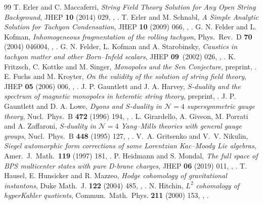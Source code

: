 \begin{thebibliography}{99}
 T. Erler and C. Maccaferri, \emph{String Field Theory Solution for Any Open String Background}, JHEP \textbf{10} (2014) 029, , .
 T. Erler and M. Schnabl, \emph{A Simple Analytic Solution for Tachyon Condensation}, JHEP \textbf{10} (2009) 066, , .
 G. N. Felder and L. Kofman, \emph{Inhomogeneous fragmentation of the rolling tachyon}, Phys.\ Rev.\ D \textbf{70} (2004) 046004, , .
 G. N. Felder, L. Kofman and A. Starobinsky, \emph{Caustics in ta\-chy\-on matter and other Born--In\-feld scalars}, JHEP \textbf{09}~(2002) 026, , .
 K. Fritzsch, C. Kottke and M. Singer, \emph{Monopoles and the Sen Conjecture}, preprint, .
 E. Fuchs and M. Kroyter, \emph{On the validity of the solution of string field theory}, JHEP \textbf{05} (2006) 006, , .
 J. P. Gauntlett and J. A. Harvey, \emph{$S$-duality and the spectrum of magnetic monopoles in heterotic string theory}, preprint, .
 J. P. Gauntlett and D. A. Lowe, \emph{Dyons and $S$-duality in $\mathcal N=4$ supersymmetric gauge theory}, Nucl.\ Phys.\ B \textbf{472} (1996) 194, , .
 L. Girardello, A. Giveon, M. Porrati and A. Zaffaroni, \emph{$S$-duality in $\mathcal N=4$ Yang--Mills theories with general gauge groups}, Nucl.\ Phys.\ B \textbf{448} (1995) 127, , .
 V.~A. Gritsenko and V.~V. Nikulin, \emph{Siegel automorphic form corrections of some Lorentzian Kac--Moody Lie algebras}, Amer.\ J.\ Math.\ \textbf{119} (1997) 181, .
 P. Heidmann and S. Mondal, \emph{The full space of BPS multicenter states with pure D-brane charges}, JHEP \textbf{06} (2019) 011, , .
 T. Hausel, E. Hunsicker and R. Mazzeo, \emph{Hodge cohomology of gravitational instantons}, Duke Math.\ J. \textbf{122} (2004) 485, , .
 N. Hitchin, \emph{$L^2$ cohomology of hyperKahler quotients}, Commun.\ Math.\ Phys. \textbf{211} (2000) 153, , .

\end{thebibliography}

